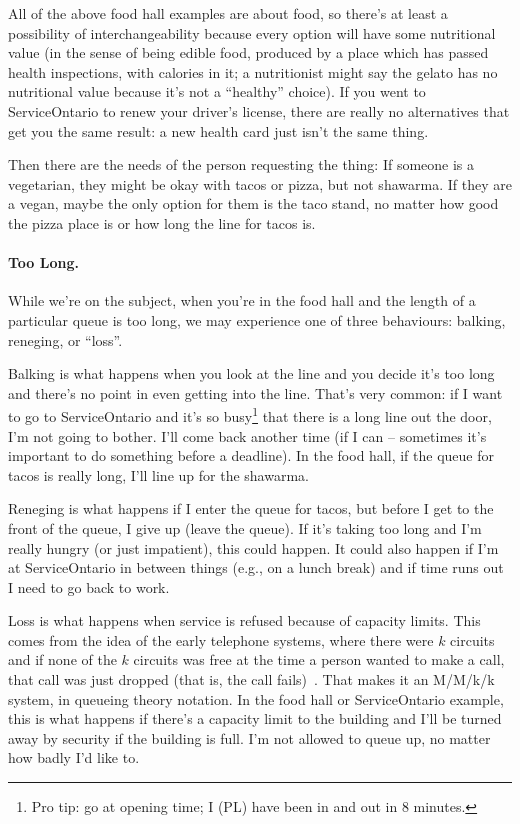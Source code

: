 All of the above food hall examples are about food, so there's at least a possibility of interchangeability because every option will have some nutritional value (in the sense of being edible food, produced by a place which has passed health inspections, with calories in it; a nutritionist might say the gelato has no nutritional value because it's not a ``healthy'' choice). If you went to ServiceOntario to renew your driver's license, there are really no alternatives that get you the same result: a new health card just isn't the same thing.

Then there are the needs of the person requesting the thing: If someone is a vegetarian, they might be okay with tacos or pizza, but not shawarma. If they are a vegan, maybe the only option for them is the taco stand, no matter how good the pizza place is or how long the line for tacos is.

\paragraph{Too Long.} 
While we're on the subject, when you're in the food hall and the length of a particular queue is too long, we may experience one of three behaviours: balking, reneging, or ``loss''. 

Balking is what happens when you look at the line and you decide it's too long and there's no point in even getting into the line. That's very common: if I want to go to ServiceOntario and it's so busy\footnote{Pro tip: go at opening time; I (PL) have been in and out in 8 minutes.} that there is a long line out the door, I'm not going to bother. I'll come back another time (if I can -- sometimes it's important to do something before a deadline). In the food hall, if the queue for tacos is really long, I'll line up for the shawarma. 

Reneging is what happens if I enter the queue for tacos, but before I get to the front of the queue, I give up (leave the queue). If it's taking too long and I'm really hungry (or just impatient), this could happen. It could also happen if I'm at ServiceOntario in between things (e.g., on a lunch break) and if time runs out I need to go back to work.

Loss is what happens when service is refused because of capacity limits. This comes from the idea of the early telephone systems, where there were $k$ circuits and if none of the $k$ circuits was free at the time a person wanted to make a call, that call was just dropped (that is, the call fails)~\cite{pmd}. That makes it an M/M/k/k system, in queueing theory notation. In the food hall or ServiceOntario example, this is what happens if there's a capacity limit to the building and I'll be turned away by security if the building is full. I'm not allowed to queue up, no matter how badly I'd like to.

